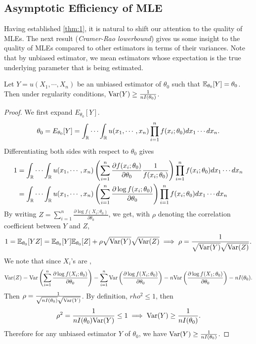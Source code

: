 \subsection{Asymptotic Efficiency of MLE}
Having established \cref{thm:1}, it is natural to shift our attention to the quality of MLEs. The next result (\emph{Cramer-Rao lowerbound}) gives us some insight to the quality of MLEs compared to other estimators in terms of their variances. Note that by unbiased estimator, we mean estimators whose expectation is the true underlying parameter that is being estimated.
\begin{theorem}\label{thm:2}
Let $Y = u(X_1,\cdots,X_n)$ be an unbiased estimator of $\theta_0$ such that $\mathbb{E}_{\theta_0}[Y] = \theta_0$. Then under regularity conditions, $\text{Var}(Y) \geq \frac{1}{nI(\theta_0)}$.
\end{theorem}
\begin{proof}
We first expand $E_{\theta_0}[Y]$.
\begin{align*}
\theta_0 = E_{\theta_0}[Y] = \int_{\mathbb{R}}\cdots\int_{\mathbb{R}} u(x_1,\cdots,x_n)\prod_{i=1}^nf(x_i;\theta_0)dx_1\cdots dx_n.
\end{align*}
Differentiating both sides with respect to $\theta_0$ gives
\begin{align*}
1 &= \int_{\mathbb{R}}\cdots\int_{\mathbb{R}} u(x_1,\cdots,x_n) \left(\sum_{i=1}^n \frac{\partial f(x_i;\theta_0)}{\partial\theta_0} \frac{1}{f(x_i;\theta_0)}\right) \prod_{i=1}^nf(x_i;\theta_0)dx_1\cdots dx_n\\
&= \int_{\mathbb{R}}\cdots\int_{\mathbb{R}} u(x_1,\cdots,x_n) \left(\sum_{i=1}^n \frac{\partial \log f(x_i;\theta_0)}{\partial\theta_0} \right) \prod_{i=1}^nf(x_i;\theta_0)dx_1\cdots dx_n
\end{align*}
By writing $Z = \sum_{i=1}^n \frac{\partial \log f(X_i;\theta_0)}{\partial\theta_0}$, we get, with $\rho$ denoting the correlation coefficient between $Y$ and $Z$,
\begin{align*}
1 = \mathbb{E}_{\theta_0}[YZ] = \mathbb{E}_{\theta_0}[Y]\mathbb{E}_{\theta_0}[Z] + \rho\sqrt{\text{Var}(Y)}\sqrt{\text{Var}(Z)} \implies \rho = \frac{1}{\sqrt{\text{Var}(Y)}\sqrt{\text{Var}(Z)}}.
\end{align*}
We note that since $X_i$'s are \iid,
\begin{align*}
\text{Var}(Z) = \text{Var}\left( \sum_{i=1}^n \frac{\partial \log f(X_i;\theta_0)}{\partial\theta_0} \right)
= \sum_{i=1}^n \text{Var}\left(\frac{\partial \log f(X_i;\theta_0)}{\partial\theta_0}\right)
= n\text{Var}\left(\frac{\partial \log f(X_1;\theta_0)}{\partial\theta_0}\right)
= nI(\theta_0).
\end{align*}
Then $\rho = \frac{1}{\sqrt{nI(\theta_0)}\sqrt{\text{Var}(Y)}}$. By definition, $rho^2 \leq 1$, then
\begin{align*}
\rho^2 = \frac{1}{nI(\theta_0)\text{Var}(Y)} \leq 1 \implies \text{Var}(Y) \geq \frac{1}{nI(\theta_0)}.
\end{align*}
Therefore for any unbiased estimator $Y$ of $\theta_0$, we have $\text{Var}(Y) \geq \frac{1}{nI(\theta_0)}$.
\end{proof}
